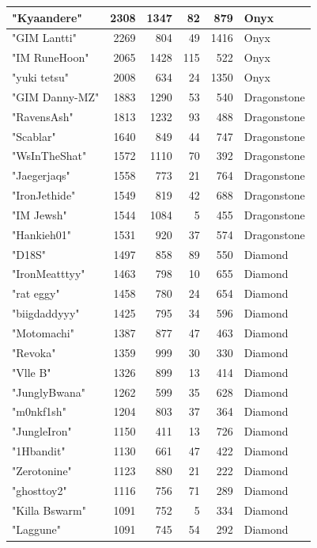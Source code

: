 \documentclass{article}
\begin{document}
\begin{table}[htbp]
\begin{tabular}{|l|r|r|r|r|l|}
"Kyaandere" & 2308 & 1347 & 82 & 879 & Onyx \\ \hline
"GIM Lantti" & 2269 & 804 & 49 & 1416 & Onyx \\ \hline
"IM RuneHoon" & 2065 & 1428 & 115 & 522 & Onyx \\ \hline
"yuki tetsu" & 2008 & 634 & 24 & 1350 & Onyx \\ \hline
"GIM Danny-MZ" & 1883 & 1290 & 53 & 540 & Dragonstone \\ \hline
"RavensAsh" & 1813 & 1232 & 93 & 488 & Dragonstone \\ \hline
"Scablar" & 1640 & 849 & 44 & 747 & Dragonstone \\ \hline
"WsInTheShat" & 1572 & 1110 & 70 & 392 & Dragonstone \\ \hline
"Jaegerjaqs" & 1558 & 773 & 21 & 764 & Dragonstone \\ \hline
"IronJethide" & 1549 & 819 & 42 & 688 & Dragonstone \\ \hline
"IM Jewsh" & 1544 & 1084 & 5 & 455 & Dragonstone \\ \hline
"Hankieh01" & 1531 & 920 & 37 & 574 & Dragonstone \\ \hline
"D18S" & 1497 & 858 & 89 & 550 & Diamond \\ \hline
"IronMeatttyy" & 1463 & 798 & 10 & 655 & Diamond \\ \hline
"rat eggy" & 1458 & 780 & 24 & 654 & Diamond \\ \hline
"biigdaddyyy" & 1425 & 795 & 34 & 596 & Diamond \\ \hline
"Motomachi" & 1387 & 877 & 47 & 463 & Diamond \\ \hline
"Revoka" & 1359 & 999 & 30 & 330 & Diamond \\ \hline
"Vlle B" & 1326 & 899 & 13 & 414 & Diamond \\ \hline
"JunglyBwana" & 1262 & 599 & 35 & 628 & Diamond \\ \hline
"m0nkf1sh" & 1204 & 803 & 37 & 364 & Diamond \\ \hline
"JungleIron" & 1150 & 411 & 13 & 726 & Diamond \\ \hline
"1Hbandit" & 1130 & 661 & 47 & 422 & Diamond \\ \hline
"Zerotonine" & 1123 & 880 & 21 & 222 & Diamond \\ \hline
"ghosttoy2" & 1116 & 756 & 71 & 289 & Diamond \\ \hline
"Killa Bswarm" & 1091 & 752 & 5 & 334 & Diamond \\ \hline
"Laggune" & 1091 & 745 & 54 & 292 & Diamond \\ \hline

\end{tabular}
\end{table}
\end{document}
